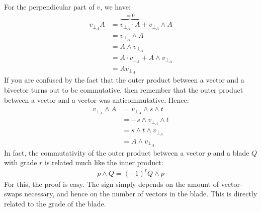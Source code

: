 \documentclass[10pt]{report}
\begin{document}
For the perpendicular part of $v$, we have:
\begin{align*}
    v_{\bot_A}A &= \overbrace{v_{\bot_A}\cdot A}^{= 0} + v_{\bot_A}\wedge A  \\
                &= v_{\bot_A}\wedge A                                        \\
                &= A\wedge v_{\bot_A}                                        \\
                &= A\cdot v_{\bot_A} + A\wedge v_{\bot_A}                    \\
                &= Av_{\bot_A}
\end{align*}
If you are confused by the fact that the outer product between a
vector and a bivector turns out to be commutative, then remember
that the outer product between a vector and a vector was
anticommutative. Hence:
\begin{align*}
          v_{\bot_A}\wedge A &= v_{\bot_A}\wedge s \wedge t \\
                             &= -s\wedge v_{\bot_A}\wedge t \\
                             &= s\wedge t\wedge v_{\bot_A}  \\
                             &= A\wedge v_{\bot_A}
\end{align*}
In fact, the commutativity of the outer product between a vector
$p$ and a blade $Q$ with grade $r$ is related much like the inner
product:
\begin{align*}
    p\wedge Q = (-1)^{r}Q\wedge p
\end{align*}
For this, the proof is easy. The sign simply depends on the amount
of vector-swaps necessary, and hence on the number of vectors in
the blade. This is directly related to the grade of the blade.
\end{document}
